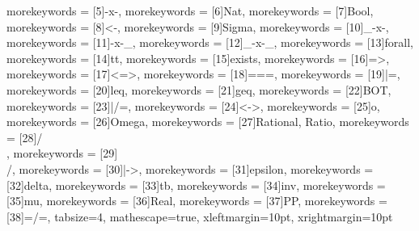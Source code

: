 {    morekeywords = [5]{-x-},
    morekeywords = [6]{Nat},
    morekeywords = [7]{Bool},
    morekeywords = [8]{<-},
    morekeywords = [9]{Sigma},
    morekeywords = [10]{_-x-},
    morekeywords = [11]{-x-_},
    morekeywords = [12]{_-x-_},
    morekeywords = [13]{forall},
    morekeywords = [14]{tt},
    morekeywords = [15]{exists},
    morekeywords = [16]{=>},
    morekeywords = [17]{<=>},
    morekeywords = [18]{===},
    morekeywords = [19]{|=},
    morekeywords = [20]{leq},    
    morekeywords = [21]{geq}, 
    morekeywords = [22]{BOT},
    morekeywords = [23]{|/=},
    morekeywords = [24]{<->},
    morekeywords = [25]{o},
    morekeywords = [26]{Omega},
    morekeywords = [27]{Rational, Ratio},
    morekeywords = [28]{/\\},
    morekeywords = [29]{\\/},
    morekeywords = [30]{|->},
    morekeywords = [31]{epsilon},
    morekeywords = [32]{delta},
    morekeywords = [33]{tb},
    morekeywords = [34]{inv},
    morekeywords = [35]{mu},
    morekeywords = [36]{Real},
    morekeywords = [37]{PP},
    morekeywords = [38]{=/=},
    tabsize=4,
    mathescape=true,
    xleftmargin=10pt,
    xrightmargin=10pt
}



\newcommand{\arr}{\rightarrow}
\newcommand{\arrleft}{\leftarrow}
\newcommand{\impl}{\Rightarrow}
\renewcommand{\iff}{\Leftrightarrow}
\newcommand{\fmap}{<\!\!\$\!\!>}


	
